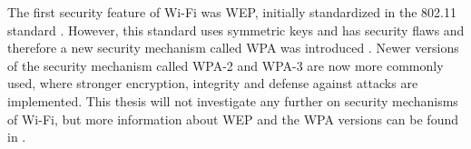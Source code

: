 The first security feature of \gls{Wi-Fi} was \gls{WEP}, initially standardized in the 802.11 standard \cite{Datacom}. However, this standard uses symmetric keys and has security flaws and therefore a new security mechanism called \gls{WPA} was introduced \cite{WAP}. Newer versions of the security mechanism called \gls{WPA}-2 and \gls{WPA}-3 are now more commonly used, where stronger encryption, integrity and defense against attacks are implemented. This thesis will not investigate any further on security mechanisms of \gls{Wi-Fi}, but more information about \gls{WEP} and the \gls{WPA} versions can be found in \cite{WAP}. 